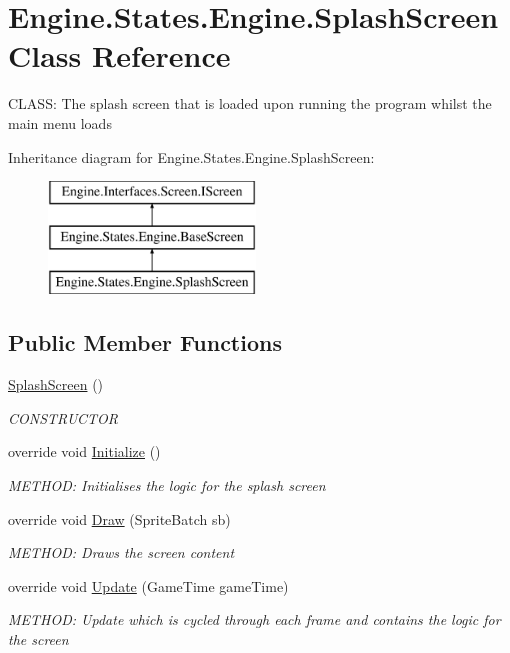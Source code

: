 \hypertarget{a00554}{}\section{Engine.\+States.\+Engine.\+Splash\+Screen Class Reference}
\label{a00554}


C\+L\+A\+SS\+: The splash screen that is loaded upon running the program whilst the main menu loads  


Inheritance diagram for Engine.\+States.\+Engine.\+Splash\+Screen\+:\begin{figure}[H]
\begin{center}
\leavevmode
\includegraphics[height=3.000000cm]{dc/df9/a00554}
\end{center}
\end{figure}
\subsection*{Public Member Functions}
\begin{DoxyCompactItemize}
\item 
\hyperlink{a00554_a7f6973cb8b6b8fa31aace32fdd2dc260}{Splash\+Screen} ()
\begin{DoxyCompactList}\small\item\em C\+O\+N\+S\+T\+R\+U\+C\+T\+OR \end{DoxyCompactList}\item 
override void \hyperlink{a00554_a321c34cdc158a49cf76f31e3cdd0863e}{Initialize} ()
\begin{DoxyCompactList}\small\item\em M\+E\+T\+H\+OD\+: Initialises the logic for the splash screen \end{DoxyCompactList}\item 
override void \hyperlink{a00554_ae50fb213e5c1efc8d3908340b236e927}{Draw} (Sprite\+Batch sb)
\begin{DoxyCompactList}\small\item\em M\+E\+T\+H\+OD\+: Draws the screen content \end{DoxyCompactList}\item 
override void \hyperlink{a00554_af245506899484c6784a44550b1364b6c}{Update} (Game\+Time game\+Time)
\begin{DoxyCompactList}\small\item\em M\+E\+T\+H\+OD\+: Update which is cycled through each frame and contains the logic for the screen \end{DoxyCompactList}\end{DoxyCompactItemize}
